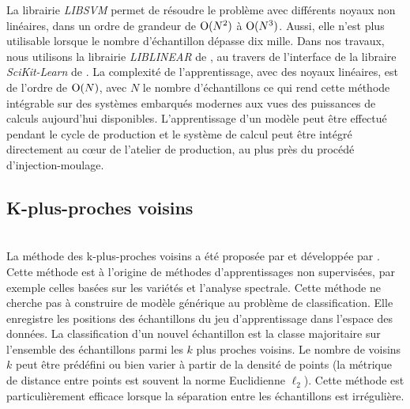La librairie \textit{LIBSVM} \cite{chang_libsvm_2011} permet de résoudre le problème avec différents noyaux non linéaires, dans un ordre de grandeur de $\operatorname{O}(N^2)$ à $\operatorname{O}(N^3)$.
Aussi, elle n'est plus utilisable lorsque le nombre d'échantillon dépasse dix mille.
Dans nos travaux, nous utilisons la librairie \textit{LIBLINEAR} de \citeauthor{fan_liblinear_2008} \cite{fan_liblinear_2008}, au travers de l'interface de la libraire \textit{SciKit-Learn} de \citeauthor{pedregosa_scikit-learn_2011} \cite{pedregosa_scikit-learn_2011}.
La complexité de l'apprentissage, avec des noyaux linéaires, est de l'ordre de $\operatorname{O}(N)$, avec $N$ le nombre d'échantillons ce qui rend cette méthode intégrable sur des systèmes embarqués modernes aux vues des puissances de calculs aujourd'hui disponibles.
L'apprentissage d'un modèle peut être effectué pendant le cycle de production et le système de calcul peut être intégré directement au cœur de l'atelier de production, au plus près du procédé d'injection-moulage.

\subsection{K-plus-proches voisins} \mbox{} \label{parag:knn} \\
La méthode des k-plus-proches voisins a été proposée par \citeauthor{fix_discriminatory_1951} \cite{fix_discriminatory_1951} et développée par \citeauthor{cover_nearest_1967} \cite{cover_nearest_1967}.
Cette méthode est à l'origine de méthodes d'apprentissages non supervisées, par exemple celles basées sur les variétés et l'analyse spectrale.
Cette méthode ne cherche pas à construire de modèle générique au problème de classification.
Elle enregistre les positions des échantillons du jeu d'apprentissage dans l'espace des données.
La classification d'un nouvel échantillon est la classe majoritaire sur l'ensemble des échantillons parmi les $k$ plus proches voisins.
Le nombre de voisins $k$ peut être prédéfini ou bien varier à partir de la densité  de points (la métrique de distance entre points est souvent la norme Euclidienne $\ell_{2}$).
Cette méthode est particulièrement efficace lorsque la séparation entre les échantillons est irrégulière.


